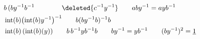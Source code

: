 \[
\begin{aligned}
&b\,(by^{-1}b^{-1}\qquad\qquad \deleted{c^{-1}y^{-1}}\qquad aby^{-1}=ayb^{-1}\\
&\operatorname{int}(b)\bigl(\operatorname{int}(b)y^{-1}\bigr)^{-1}
\qquad b(by^{-1}b)^{-1}b\\
&\operatorname{int}(b)\,(\operatorname{int}(b)(y))\qquad
b\,b^{-1}yb^{-1}b\qquad by^{-1}=yb^{-1}\qquad (by^{-1})^2=\underline{1}
\end{aligned}
\]

